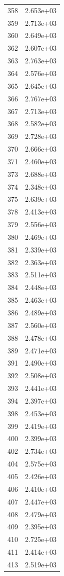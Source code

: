 \documentclass[12pt]{article}
\begin{document}
\begin{longtable}{@{}cc@{}}
358 & 2.653e+03 \\
359 & 2.713e+03 \\
360 & 2.649e+03 \\
362 & 2.607e+03 \\
363 & 2.763e+03 \\
364 & 2.576e+03 \\
365 & 2.645e+03 \\
366 & 2.767e+03 \\
367 & 2.713e+03 \\
368 & 2.582e+03 \\
369 & 2.728e+03 \\
370 & 2.666e+03 \\
371 & 2.460e+03 \\
373 & 2.688e+03 \\
374 & 2.348e+03 \\
375 & 2.639e+03 \\
378 & 2.413e+03 \\
379 & 2.556e+03 \\
380 & 2.469e+03 \\
381 & 2.339e+03 \\
382 & 2.363e+03 \\
383 & 2.511e+03 \\
384 & 2.448e+03 \\
385 & 2.463e+03 \\
386 & 2.489e+03 \\
387 & 2.560e+03 \\
388 & 2.478e+03 \\
389 & 2.471e+03 \\
391 & 2.490e+03 \\
392 & 2.508e+03 \\
393 & 2.441e+03 \\
394 & 2.397e+03 \\
398 & 2.453e+03 \\
399 & 2.419e+03 \\
400 & 2.399e+03 \\
402 & 2.734e+03 \\
404 & 2.575e+03 \\
405 & 2.426e+03 \\
406 & 2.410e+03 \\
407 & 2.447e+03 \\
408 & 2.479e+03 \\
409 & 2.395e+03 \\
410 & 2.725e+03 \\
411 & 2.414e+03 \\
413 & 2.519e+03 \\

\end{longtable}
\end{document}
